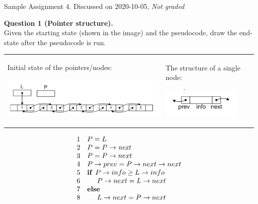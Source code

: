 \documentclass[a4paper,12pt]{article}
\begin{document}
\thispagestyle{empty}

\begin{center}
{\Large Sample Assignment 4. Discussed on 2020-10-05,} 
{\em Not graded} 
\end{center}

\vspace{10pt}
{\bf Question 1 (Pointer structure).}\\ 
Given the starting state 
(shown in the image) and the pseudocode, draw the end-state 
after the pseudocode is run. 

\vspace{10pt}
\begin{tabular}[t]{@{}ll@{}} 
\begin{minipage}[t]{0.68\columnwidth}
Initial state of the pointers/nodes:
\begin{center}
\includegraphics[width=3.5in]{assignment04-pointers/sample-assignment04-pointers.png}
\end{center}

\end{minipage} &
\begin{minipage}[t]{0.25\columnwidth}

The structure of a single node:

\begin{center}
\includegraphics[width=1.5in]{assignment04-pointers/sample-assignment04-structure.png}
\end{center}


\end{minipage}
\end{tabular}


\[
\begin{array}{r l}
1 & P = L \\
2 & P = P \rightarrow \textit{next} \\
3 & P = P \rightarrow next \\
4 & P \rightarrow prev = P \rightarrow next \rightarrow next \\
5 & \text{\textbf{if\ }} P \rightarrow info \geq L \rightarrow info\\
6 & \hspace{.5cm} P \rightarrow next = L \rightarrow next\\
7 & \text{\textbf{else\ }}\\
8 & \hspace{.5cm} L \rightarrow next = P \rightarrow next\\
\end{array}
\]
\end{document}
